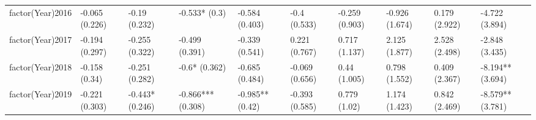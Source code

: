 \begin{table}[ht]
\begin{tabular}{llllllllll}
  factor(Year)2016 & -0.065 (0.226) & -0.19 (0.232) & -0.533* (0.3) & -0.584 (0.403) & -0.4 (0.533) & -0.259 (0.903) & -0.926 (1.674) & 0.179 (2.922) & -4.722 (3.894) \\ 
  factor(Year)2017 & -0.194 (0.297) & -0.255 (0.322) & -0.499 (0.391) & -0.339 (0.541) & 0.221 (0.767) & 0.717 (1.137) & 2.125 (1.877) & 2.528 (2.498) & -2.848 (3.435) \\ 
  factor(Year)2018 & -0.158 (0.34) & -0.251 (0.282) & -0.6* (0.362) & -0.685 (0.484) & -0.069 (0.656) & 0.44 (1.005) & 0.798 (1.552) & 0.409 (2.367) & -8.194** (3.694) \\ 
  factor(Year)2019 & -0.221 (0.303) & -0.443* (0.246) & -0.866*** (0.308) & -0.985** (0.42) & -0.393 (0.585) & 0.779 (1.02) & 1.174 (1.423) & 0.842 (2.469) & -8.579** (3.781) \\ 
   \bottomrule
\end{tabular}
\endgroup
\end{table}
